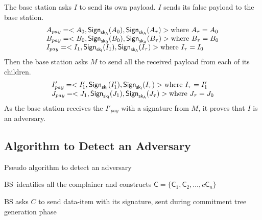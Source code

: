 \documentclass[%
  slidesonly,%
  semlayer%
  ]{seminar}                                  %
\newcommand{\sk}{\sf{sk}}
\begin{document}
\begin{slide}
        The base station asks $I$ to send its own payload.
        $I$ sends its false payload to the base station.
        \begin{equation*}
          \begin{array}{l}
            A_{pay} = <A_{0}, \textsf{Sign}_{\sk_{A}}(A_{0}), \textsf{Sign}_{\sk_{A}}(A_{\tau})> \mbox{where}\ A_{\tau} = A_{0}\\
            B_{pay} = <B_{0}, \textsf{Sign}_{\sk_{B}}(B_{0}), \textsf{Sign}_{\sk_{A}}(B_{\tau})> \mbox{where}\ B_{\tau} = B_{0}\\
            I_{pay} = <I_{1}, \textsf{Sign}_{\sk_{I}}(I_{1}), \textsf{Sign}_{\sk_{A}}(I_{\tau})> \mbox{where}\ I_{\tau} = I_{0}\\
          \end{array}
        \end{equation*}
        Then the base station asks $M$ to send all the received payload from each of its children.
        \begin{equation*}
          \begin{array}{l}
            I'_{pay} = <I'_{1}, \textsf{Sign}_{\sk_{I}}(I'_{1}), \textsf{Sign}_{\sk_{I}}(I_{\tau})> \mbox{where}\ I_{\tau} = I'_{1}\\
            J_{pay} = <J_{1}, \textsf{Sign}_{\sk_{I}}(J_{1}), \textsf{Sign}_{\sk_{A}}(J_{\tau})> \mbox{where}\ J_{\tau} = J_{0}\\
          \end{array}
        \end{equation*}
        As the base station receives the $I'_{pay}$ with a signature from $M$, it proves that $I$ is an adversary.
        \vfill
        \clearpage

    \subsection*{Algorithm to Detect an Adversary}
        \begin{algorithm}
          \caption{Pseudo algorithm to detect an adversary}
          \label{algo:detect-an-adversary}
          \begin{algorithmic}[1]

            \STATE BS\ identifies all the complainer and constructs $\textsf{C} = \{\textsf{C}_{1}, \textsf{C}_{2}, \dotsc, c\textsf{C}_{n}\}$

              \STATE BS asks $C$ to send data-item with its signature, sent during commitment tree generation phase
            

\end{algorithmic}
\end{algorithm}
\end{slide}
\end{document}
